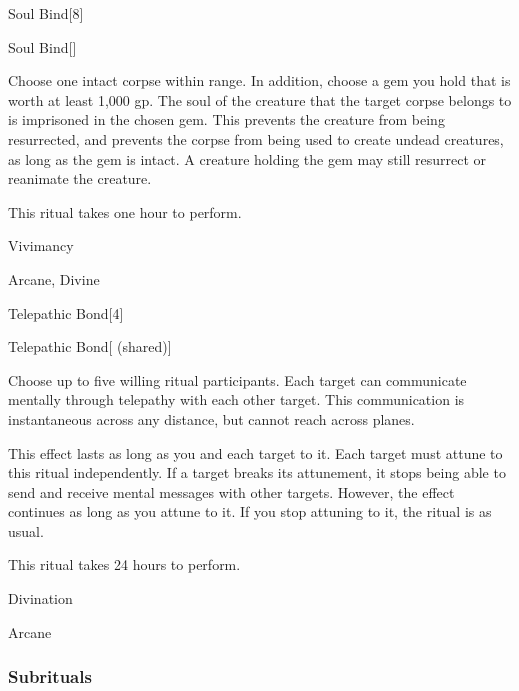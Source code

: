 \begin{spellsection}{Soul Bind}[8]


\begin{ability}{Soul Bind}[]

Choose one intact corpse within \rngclose range.
In addition, choose a gem you hold that is worth at least 1,000 gp.
The soul of the creature that the target corpse belongs to is imprisoned in the chosen gem.
This prevents the creature from being resurrected, and prevents the corpse from being used to create undead creatures, as long as the gem is intact.
A creature holding the gem may still resurrect or reanimate the creature.

This ritual takes one hour to perform.

\end{ability}




 Vivimancy

 Arcane, Divine
\end{spellsection}


\begin{spellsection}{Telepathic Bond}[4]


\begin{ability}{Telepathic Bond}[ (shared)]

Choose up to five willing ritual participants.
Each target can communicate mentally through telepathy with each other target.
This communication is instantaneous across any distance, but cannot reach across planes.

This effect lasts as long as you and each target  to it.
Each target must attune to this ritual independently.
If a target breaks its attunement, it stops being able to send and receive mental messages with other targets.
However, the effect continues as long as you attune to it.
If you stop attuning to it, the ritual is  as usual.

This ritual takes 24 hours to perform.

\end{ability}




 Divination

 Arcane
\end{spellsection}


\subsubsection{Subrituals}


